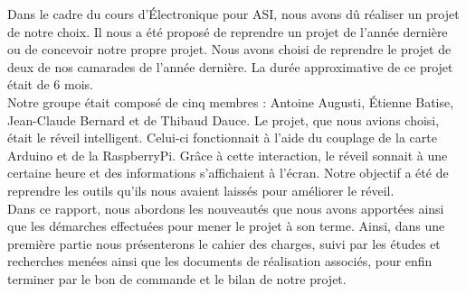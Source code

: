 Dans le cadre du cours d'Électronique pour ASI, nous avons dû réaliser un projet de notre choix. Il nous a été proposé de reprendre un projet de l'année dernière ou de concevoir notre propre projet. Nous avons choisi de reprendre le projet de deux de nos camarades de l'année dernière. La durée approximative de ce projet était de 6 mois.\\

Notre groupe était composé de cinq membres : Antoine Augusti, Étienne Batise, Jean-Claude Bernard et de Thibaud Dauce. Le projet, que nous avions choisi, était le réveil intelligent. Celui-ci fonctionnait à l'aide du couplage de la carte Arduino et de la RaspberryPi. Grâce à cette interaction, le réveil sonnait à une certaine heure et  des informations s'affichaient à l'écran. Notre objectif a été de reprendre les outils qu'ils nous avaient laissés pour améliorer le réveil.\\

Dans ce rapport, nous abordons les nouveautés que nous avons apportées ainsi que les démarches effectuées pour mener le projet à son terme. Ainsi, dans une première partie nous présenterons le cahier des charges, suivi par les études et recherches menées ainsi que les documents de réalisation associés, pour enfin terminer par le bon de commande et le bilan de notre projet.
